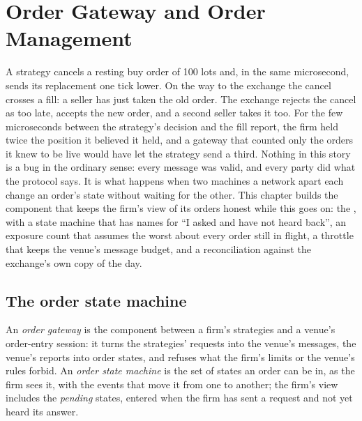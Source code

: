 \chapter{Order Gateway and Order Management}\label{ch:ll:order-gateway-and-order-management}

A strategy cancels a resting buy order of 100 lots and, in the same microsecond, sends its replacement one tick lower. On the
way to the exchange the cancel crosses a fill: a seller has just taken the old order. The exchange rejects the cancel as too
late, accepts the new order, and a second seller takes it too. For the few microseconds between the strategy's decision and the
fill report, the firm held twice the position it believed it held, and a gateway that counted only the orders it knew to be
live would have let the strategy send a third. Nothing in this story is a bug in the ordinary sense: every message was valid,
and every party did what the protocol says. It is what happens when two machines a network apart each change an order's state
without waiting for the other. This chapter builds the component that keeps the firm's view of its orders honest while
this goes on: the , with a state machine that has names for ``I asked and have not heard back'', an exposure count
that assumes the worst about every order still in flight, a throttle that keeps the venue's message budget, and a
reconciliation against the exchange's own copy of the day.

\section{The order state machine}

\begin{definition}\label{def:ll:order-gateway-and-order-management:gateway}
An \emph{order gateway} is the component between a firm's strategies and a venue's order-entry session:
it turns the strategies' requests into the venue's messages, the venue's reports into order states, and refuses what the firm's
limits or the venue's rules forbid. An \emph{order state machine} is the set of states an order can
be in, as the firm sees it, with the events that move it from one to another; the firm's view includes the \emph{pending}
states, entered when the firm has sent a request and not yet heard its answer.
\end{definition}

